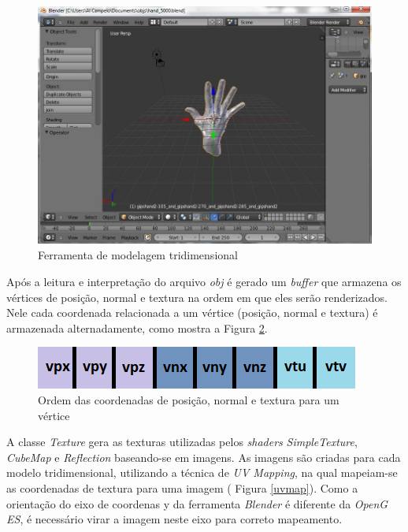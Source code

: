 	\begin{figure}[h]
	\centering
		\includegraphics[keepaspectratio=true,scale=0.7]{figuras/blender.jpg}
	\caption{Ferramenta de modelagem tridimensional}
	\label{blender}
	\end{figure}

	Após a leitura e interpretação do arquivo \textit{obj} é gerado um \textit{buffer} que armazena os vértices de posição, normal e textura na ordem em que eles serão renderizados. Nele cada coordenada relacionada a um vértice (posição, normal e textura) é armazenada alternadamente, como mostra a Figura \ref{buffer}.

	\begin{figure}[h]
	\centering
		\includegraphics[keepaspectratio=true,scale=1.0]{figuras/buffer.png}
	\caption{Ordem das coordenadas de posição, normal e textura para um vértice}
	\label{buffer}
	\end{figure}

	A classe \textit{Texture} gera as texturas utilizadas pelos \textit{shaders} \textit{SimpleTexture}, \textit{CubeMap} e \textit{Reflection} baseando-se em imagens. As imagens são criadas para cada modelo tridimensional, utilizando a técnica de \textit{UV Mapping}, na qual mapeiam-se as coordenadas de textura para uma imagem ( Figura \ref{uvmap}). Como a orientação do eixo de coordenas y da ferramenta \textit{Blender} é diferente da \textit{OpenG ES}, é necessário virar a imagem neste eixo para correto mapeamento.

